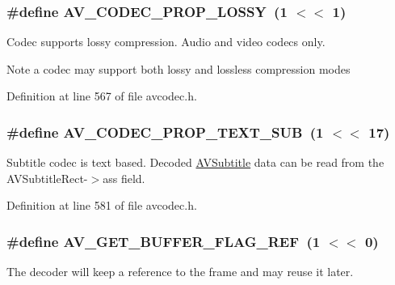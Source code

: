 \subsubsection[{\texorpdfstring{A\+V\+\_\+\+C\+O\+D\+E\+C\+\_\+\+P\+R\+O\+P\+\_\+\+L\+O\+S\+SY}{AV_CODEC_PROP_LOSSY}}]{\setlength{\rightskip}{0pt plus 5cm}\#define A\+V\+\_\+\+C\+O\+D\+E\+C\+\_\+\+P\+R\+O\+P\+\_\+\+L\+O\+S\+SY~(1 $<$$<$ 1)}\hypertarget{group__lavc__core_ga0bb6cb9b395a0f2345eb41ed990fbf9f}{}\label{group__lavc__core_ga0bb6cb9b395a0f2345eb41ed990fbf9f}
Codec supports lossy compression. Audio and video codecs only. \begin{DoxyNote}{Note}
a codec may support both lossy and lossless compression modes 
\end{DoxyNote}


Definition at line 567 of file avcodec.\+h.

\subsubsection[{\texorpdfstring{A\+V\+\_\+\+C\+O\+D\+E\+C\+\_\+\+P\+R\+O\+P\+\_\+\+T\+E\+X\+T\+\_\+\+S\+UB}{AV_CODEC_PROP_TEXT_SUB}}]{\setlength{\rightskip}{0pt plus 5cm}\#define A\+V\+\_\+\+C\+O\+D\+E\+C\+\_\+\+P\+R\+O\+P\+\_\+\+T\+E\+X\+T\+\_\+\+S\+UB~(1 $<$$<$ 17)}\hypertarget{group__lavc__core_gae1c276095faaece7c097f8fd9f1184db}{}\label{group__lavc__core_gae1c276095faaece7c097f8fd9f1184db}
Subtitle codec is text based. Decoded \hyperlink{struct_a_v_subtitle}{A\+V\+Subtitle} data can be read from the A\+V\+Subtitle\+Rect-\/$>$ass field. 

Definition at line 581 of file avcodec.\+h.

\subsubsection[{\texorpdfstring{A\+V\+\_\+\+G\+E\+T\+\_\+\+B\+U\+F\+F\+E\+R\+\_\+\+F\+L\+A\+G\+\_\+\+R\+EF}{AV_GET_BUFFER_FLAG_REF}}]{\setlength{\rightskip}{0pt plus 5cm}\#define A\+V\+\_\+\+G\+E\+T\+\_\+\+B\+U\+F\+F\+E\+R\+\_\+\+F\+L\+A\+G\+\_\+\+R\+EF~(1 $<$$<$ 0)}\hypertarget{group__lavc__core_ga6b4950dd3320e524f648799927f256a7}{}\label{group__lavc__core_ga6b4950dd3320e524f648799927f256a7}
The decoder will keep a reference to the frame and may reuse it later. 

